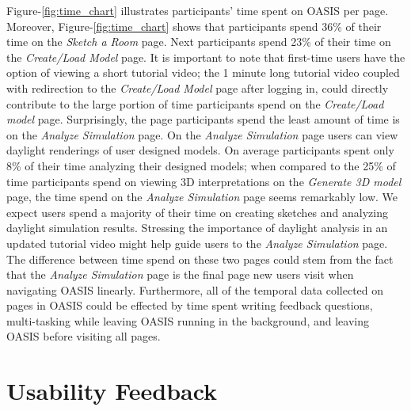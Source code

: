 Figure-\ref{fig:time_chart} illustrates participants' time spent on OASIS per page.
Moreover, Figure-\ref{fig:time_chart} shows that participants spend 36\% of their time on the \textit{ Sketch a Room} page.
Next participants spend 23\% of their time on the \textit{Create/Load Model} page.
It is important to note that first-time users have the option of viewing a short tutorial video; 
the 1 minute long tutorial video coupled with redirection to the \textit{Create/Load Model} page after logging in, could directly contribute to the large portion of time participants spend on the \textit{Create/Load model} page.
Surprisingly, the page participants spend the least amount of time is on the \textit{Analyze Simulation} page. 
On the \textit{Analyze Simulation} page users can view daylight renderings of user designed models.
On average participants spent only 8\% of their time analyzing their designed models;
when compared to the 25\% of time participants spend on viewing 3D interpretations on the \textit{Generate 3D model} page, the time spend on the \textit{Analyze Simulation} page seems remarkably low.
We expect users spend a majority of their time on creating sketches and analyzing daylight simulation results.
Stressing the importance of daylight analysis in an updated tutorial video might help guide users to the \textit{Analyze Simulation} page.
The difference between time spend on these two pages could stem from the fact that the \textit{Analyze Simulation} page is the final page new users visit when navigating OASIS linearly.
Furthermore, all of the temporal data collected on pages in OASIS could be effected by time spent writing feedback questions, multi-tasking while leaving OASIS running in the background, and leaving OASIS before visiting all pages.
 
\section{Usability Feedback}

